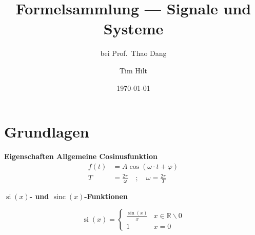 \documentclass[12pt, a4paper, twoside]{scrartcl}
\title{Formelsammlung --- Signale und Systeme}
\subtitle{bei Prof.\ Thao Dang}
\author{Tim Hilt}
\date{\today}
\begin{document}
\sffamily
\maketitle
\tableofcontents


\section{Grundlagen}

\textbf{Eigenschaften Allgemeine Cosinusfunktion}
\begin{align*}
  f(t) &= A\cos(\omega \cdot t + \varphi)\\
  T &= \frac{2\pi}{\omega} \quad ; \quad \omega = \frac{2\pi}{T}
\end{align*}

\textbf{\(\operatorname{si}(x)\)- und \(\operatorname{sinc}(x)\)-Funktionen}

\begin{minipage}{.5\linewidth}
\[
  \operatorname{si}(x)=
  \begin{cases}
    \frac{\sin(x)}{x} & x \in \mathbb{R} \backslash 0\\
    1 & x = 0
  \end{cases}
\]
\end{minipage}%
\begin{minipage}{.5\linewidth}
  \begin{center}
  \end{center}
\end{minipage}
\end{document}
